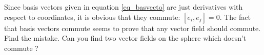 \begin{exercice}\label{exo016}

Since basis vectors given in equation \eqref{eq_basvecto} are just derivatives with respect to coordinates, it is obvious that they commute: $[e_i,e_j]=0$. The fact that basis vectors commute seems to prove that any vector field should commute. Find the mistake. Can you find two vector fields on the sphere which doesn't commute ?

\end{exercice}
